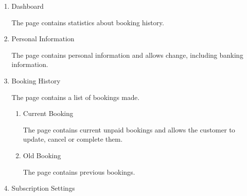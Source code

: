 \documentclass[12pt]{article}
\begin{document}
\begin{enumerate}
        \begin{enumerate}
          \item
          \begin{description}
            \item[Dashboard]
          \end{description}
      
          The page contains statistics about booking history.
      
          \item     
          \begin{description}
            \item[Personal Information]
          \end{description}
  
          The page contains personal information and allows change, including banking information.
  
          \item     
          \begin{description}
            \item[Booking History]
          \end{description}
  
          The page contains a list of bookings made.
  
          \begin{enumerate}
            \item         
            \begin{description}
              \item[Current Booking]
            \end{description}
  
            The page contains current unpaid bookings and allows the customer to update, cancel or complete them.
  
            \item         
            \begin{description}
              \item[Old Booking]
            \end{description}
  
            The page contains previous bookings.
  
          \end{enumerate}
  
          \item     
          \begin{description}
            \item[Subscription Settings]
          \end{description}
  

\end{enumerate}
\end{enumerate}
\end{document}

